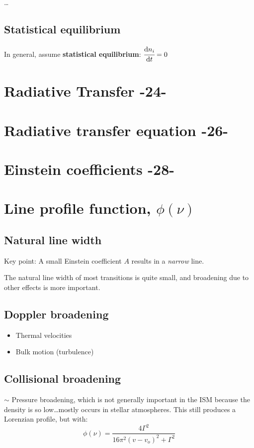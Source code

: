 \documentclass[12pt]{article}
\begin{document}
\ldots

\subsection{Statistical equilibrium}
In general, assume \textbf{statistical equilibrium}:
$\cfrac{\mathrm{d}n_{i}}{\mathrm{d}t} = 0$

\section{Radiative Transfer -24-}
\section{Radiative transfer equation -26-}
\section{Einstein coefficients -28-}

\section{Line profile function, $\phi(\nu)$}
\reversemarginpar
{}
\subsection{Natural line width}

\textcolor{bred}{Key point: A small Einstein coefficient $A$ results
in a \emph{narrow} line.}

The natural line width of most transitions is quite small, and broadening
due to other effects is more important.
\subsection{Doppler broadening}
\begin{itemize}
    \item Thermal velocities
    \item Bulk motion (turbulence)
\end{itemize}
\subsection{Collisional broadening}
$\sim$ Pressure broadening, which is not generally important in the ISM because
the density is so low\ldots mostly occurs in stellar atmospheres.
This still produces a Lorenzian profile, but with:
$${
    \phi(\nu) = \frac{4\Gamma^{2}}{16\pi^{2}(v-v_{o})^{2} + \Gamma^{2}}
}$$
\end{document}
